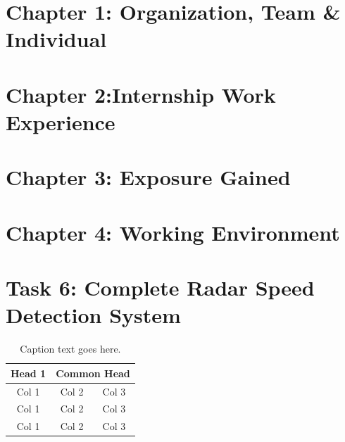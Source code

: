 \documentclass[12pt,a4paper]{article}
\begin{document}


\pagebreak 
\tableofcontents
\pagebreak

\pagebreak

\pagebreak
\section{Chapter 1: Organization, Team \& Individual}



\section{Chapter 2:Internship Work Experience}



\section{Chapter 3: Exposure Gained}




\section{Chapter 4: Working Environment}


\pagebreak



\section{Task 6: Complete Radar Speed Detection System}

	\begin{table}[b]

		\caption{\label{tab1}Caption text goes here.}
		
		\centering
		
		\begin{tabular}{| c | c | c |}
		
		\hline
		
		Head 1 & \multicolumn{2}{c|}{Common Head}\\
		
		\hline
		
		Col 1 & Col 2 & Col 3 \\
		
		\hline Col 1 & Col 2 & Col 3 \\
		
		\hline Col 1 & Col 2 & Col 3 \\
		
		\hline
		
		\end{tabular}
		
		\end{table}
\end{document}
